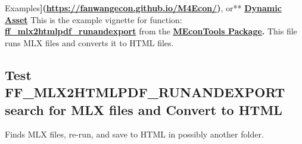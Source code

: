 \documentclass[
]{book}
\begin{document}
Examples\textbf{{]}(\url{https://fanwangecon.github.io/M4Econ/})}, or** \href{https://fanwangecon.github.io/CodeDynaAsset/}{\textbf{Dynamic
Asset}}
This is the example vignette for function:
\href{https://github.com/FanWangEcon/MEconTools/blob/master/MEconTools/sys/ff_mlx2htmlpdf_runandexport.m}{\textbf{ff\_mlx2htmlpdf\_runandexport}}
from the \href{https://fanwangecon.github.io/MEconTools/}{\textbf{MEconTools
Package}}\textbf{.} This file
runs MLX files and converts it to HTML files.

\hypertarget{test-ff_mlx2htmlpdf_runandexport-search-for-mlx-files-and-convert-to-html}{%
\subsection{Test FF\_MLX2HTMLPDF\_RUNANDEXPORT search for MLX files and Convert to HTML}\label{test-ff_mlx2htmlpdf_runandexport-search-for-mlx-files-and-convert-to-html}}

Finds MLX files, re-run, and save to HTML in possibly another folder.
\end{document}
